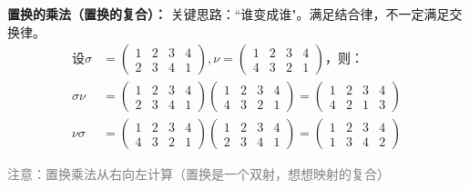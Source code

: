 \documentclass[zihao=-4,UTF8]{report}
\begin{document}
\textbf{置换的乘法（置换的复合）：}
关键思路：``谁变成谁"。满足结合律，不一定满足交换律。
\begin{align*}
    \text{设}\sigma &=
    \begin{pmatrix}
    1&  2&  3& 4\\
    2&  3&  4&1
    \end{pmatrix} ,
\nu =
    \begin{pmatrix}
    1&  2&  3& 4\\
    4&  3&  2&1
    \end{pmatrix}\text{，则：}\\
    \sigma \nu &= 
        \begin{pmatrix}
        1&  2&  3& 4\\
        2&  3&  4&1
        \end{pmatrix}
        \begin{pmatrix}
            1&  2&  3& 4\\
            4&  3&  2&1
        \end{pmatrix}=
        \begin{pmatrix}
            1&  2&  3& 4\\
            4&  2&  1& 3
        \end{pmatrix}\\
     \nu \sigma &= 
        \begin{pmatrix}
            1&  2&  3& 4\\
            4&  3&  2&1
        \end{pmatrix}
        \begin{pmatrix}
            1&  2&  3& 4\\
            2&  3&  4&1
        \end{pmatrix}=
        \begin{pmatrix}
            1&  2&  3& 4\\
            1&  3&  4& 2
        \end{pmatrix}
\end{align*}\par
\textcolor{gray}{注意：置换乘法从右向左计算（置换是一个双射，想想映射的复合）}
\end{document}
